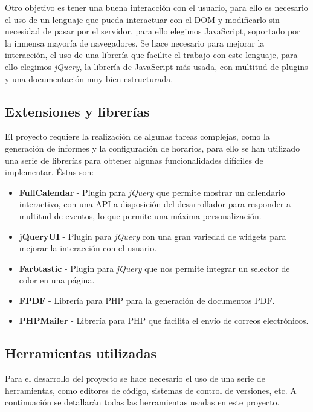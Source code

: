 \documentclass[a4paper,11pt]{article} %
\begin{document}
Otro objetivo es tener una buena interacción con el usuario, para ello es necesario el uso de un lenguaje que pueda interactuar con el DOM y modificarlo sin necesidad de pasar por el servidor, para ello elegimos JavaScript, soportado por la inmensa mayoría de navegadores. Se hace necesario para mejorar la interacción, el uso de una librería que facilite el trabajo con este lenguaje, para ello elegimos {\em jQuery}, la librería de JavaScript más usada, con multitud de plugins y una documentación muy bien estructurada.

\subsection{Extensiones y librerías}

El proyecto requiere la realización de algunas tareas complejas, como la generación de informes y la configuración de horarios, para ello se han utilizado una serie de librerías para obtener algunas funcionalidades difíciles de implementar. Éstas son:

\begin{itemize}

\item {\bf FullCalendar} - Plugin para {\em jQuery} que permite mostrar un calendario interactivo, con una API a disposición del desarrollador para responder a multitud de eventos, lo que permite una máxima personalización.
\item {\bf jQueryUI} - Plugin para {\em jQuery} con una gran variedad de widgets para mejorar la interacción con el usuario.
\item {\bf Farbtastic} - Plugin para {\em jQuery} que nos permite integrar un selector de color en una página.
\item {\bf FPDF} - Librería para PHP para la generación de documentos PDF.
\item {\bf PHPMailer} - Librería para PHP que facilita el envío de correos electrónicos.
\end{itemize}

\subsection{Herramientas utilizadas}

Para el desarrollo del proyecto se hace necesario el uso de una serie de herramientas, como editores de código, sistemas de control de versiones, etc. A continuación se detallarán todas las herramientas usadas en este proyecto.\\
\end{document}
